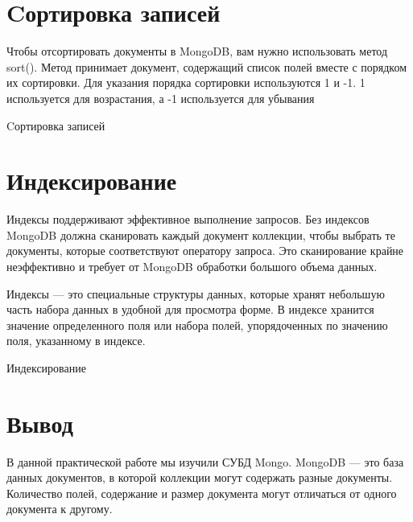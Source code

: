 \clearpage
\section{Cортировка записей}

Чтобы отсортировать документы в MongoDB, вам нужно использовать
метод sort(). Метод принимает документ, содержащий список полей вместе с
порядком их сортировки. Для указания порядка сортировки используются 1 и -1.
1 используется для возрастания, а -1 используется для убывания

\begin{image}
	\caption{Cортировка записей}
	\label{fig:sort}
\end{image}

\clearpage
\section{Индексирование}

Индексы поддерживают эффективное выполнение запросов. Без индексов
MongoDB должна сканировать каждый документ коллекции, чтобы выбрать те
документы, которые соответствуют оператору запроса. Это сканирование
крайне неэффективно и требует от MongoDB обработки большого объема
данных.\par
Индексы — это специальные структуры данных, которые хранят
небольшую часть набора данных в удобной для просмотра форме. В индексе
хранится значение определенного поля или набора полей, упорядоченных по
значению поля, указанному в индексе.

\begin{image}
	\caption{Индексирование}
	\label{fig:index}
\end{image}

\clearpage

\section*{\LARGE Вывод}
В данной практической работе мы изучили СУБД Mongo.
MongoDB --- это база данных
документов, в которой коллекции могут содержать разные документы.
Количество полей, содержание и размер документа могут отличаться от одного
документа к другому.